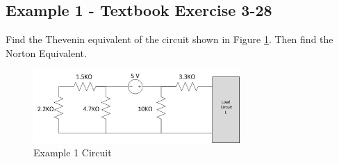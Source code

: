 \documentclass{handout}
\begin{document}
\subsection{Example 1 - Textbook Exercise 3-28}
Find the Thevenin equivalent of the circuit shown in Figure \ref{fig: Example1}.  Then find the Norton Equivalent.
\begin{figure} [h t b]
\centering
\includegraphics[width=0.7\textwidth]{Example1.jpg}
\caption{Example 1 Circuit}
\label{fig: Example1}
\end{figure}

\end{document}
